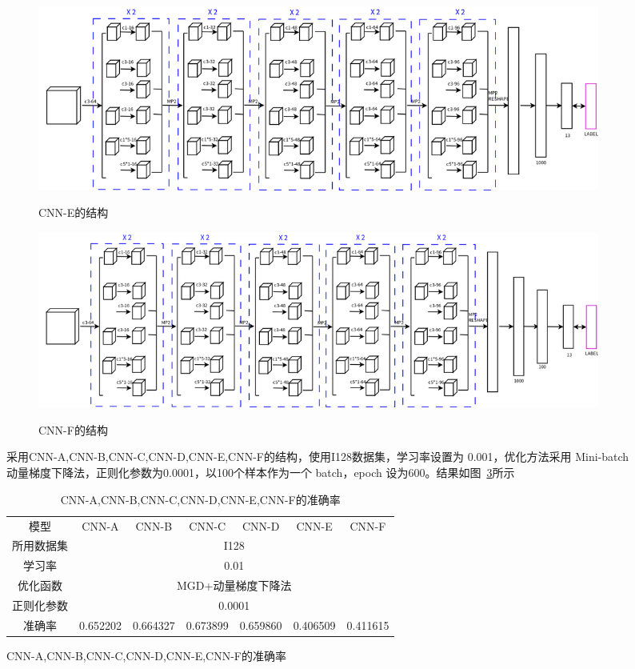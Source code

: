 \begin{figure}[htb]
\begin{figure}[htb]
\centering
\includegraphics[scale=0.3]{../figures/inception2.png} 
\label{fig:inception2}
\caption{CNN-E的结构}
\end{figure}

\begin{figure}[htb]
\centering
\includegraphics[scale=0.3]{../figures/inception3.png} 
\label{fig:inception3}
\caption{CNN-F的结构}
\end{figure}

采用CNN-A,CNN-B,CNN-C,CNN-D,CNN-E,CNN-F的结构，使用I128数据集，学习率设置为 0.001，优化方法采用 Mini-batch 动量梯度下降法，正则化参数为0.0001，以100个样本作为一个 batch，epoch 设为600。结果如图~\ref{fig:cnn9}所示

\begin{table}[htb]
\centering
\caption{CNN-A,CNN-B,CNN-C,CNN-D,CNN-E,CNN-F的准确率}
\begin{tabular}{ccccccc}
\toprule[2pt]
模型 & CNN-A & CNN-B & CNN-C & CNN-D & CNN-E & CNN-F \\ 
所用数据集 & \multicolumn{6}{c}{I128}\\
学习率 & \multicolumn{6}{c}{0.01}\\
优化函数  & \multicolumn{6}{c}{MGD+动量梯度下降法}\\
正则化参数 & \multicolumn{6}{c}{0.0001}\\
\midrule[1pt]
准确率 & 0.652202 & 0.664327 & 0.673899 & 0.659860 & 0.406509 & 0.411615 \\ 
\bottomrule[2pt]
\end{tabular} 
\label{fig:cnn9}
\end{table}


\end{figure}
